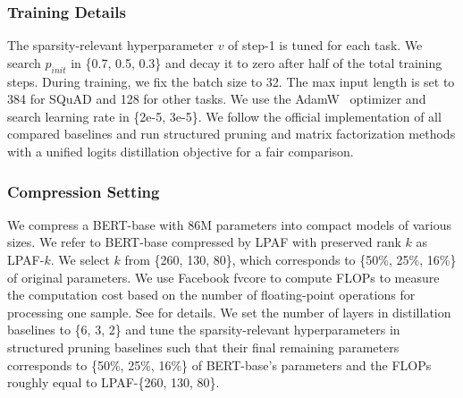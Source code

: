 \subsubsection{Training Details}
The sparsity-relevant hyperparameter $v$  of step-1 is tuned for each task. We search $p_{init}$ in \{0.7, 0.5, 0.3\} and decay it to zero after half of the total training steps. During training, we
fix the batch size to 32. The max input length is set to 384 for SQuAD and 128 for other tasks. We use the AdamW~\cite{adamw} optimizer and search learning rate in \{2e-5, 3e-5\}. We follow the official implementation of all compared baselines and run structured pruning and matrix factorization methods with a unified logits distillation objective for a fair comparison.


\subsubsection{Compression Setting}

We compress a BERT-base with 86M parameters into compact models of various sizes. 
We refer to BERT-base compressed by  LPAF with preserved rank $k$ as LPAF-$k$. We select $k$ from \{260, 130, 80\}, which corresponds to \{50\%, 25\%, 16\%\} of original parameters. We use  Facebook fvcore to compute FLOPs to measure the computation cost based on the number of floating-point operations for processing one sample. See  for details. We set the number of layers in distillation baselines to \{6, 3, 2\} and tune the sparsity-relevant hyperparameters in structured pruning baselines such that  their final remaining parameters corresponds to \{50\%, 25\%, 16\%\} of BERT-base's parameters and the FLOPs roughly equal to LPAF-\{260, 130, 80\}.

